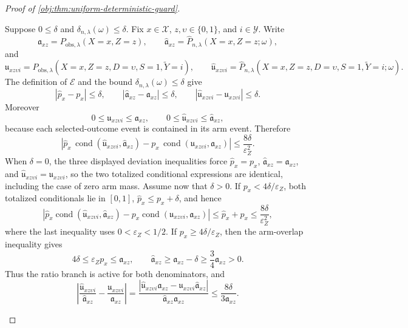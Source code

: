 \begin{proof}[Proof of \cref{obj:thm:uniform-deterministic-guard}]
\begin{enumerate}
Suppose \(0\le \delta\) and \(\delta_{n,\lambda}(\omega)\le\delta\).  Fix \(x\in\mathcal X\), \(z,\upsilon\in\{0,1\}\), and \(i\in\mathcal Y\).  Write
\[
\mathfrak a_{xz}=P_{\mathrm{obs},\lambda}(X=x,Z=z),
\qquad
\widehat{\mathfrak a}_{xz}
=
\widehat P_{n,\lambda}(X=x,Z=z;\omega),
\]
and
\[
\mathfrak u_{xz\upsilon i}=P_{\mathrm{obs},\lambda}(X=x,Z=z,D=\upsilon,S=1,\widetilde Y=i),
\qquad
\widehat{\mathfrak u}_{xz\upsilon i}
=
\widehat P_{n,\lambda}(X=x,Z=z,D=\upsilon,S=1,\widetilde Y=i;\omega).
\]
The definition of \(\mathcal E\) and the bound
\(\delta_{n,\lambda}(\omega)\le\delta\) give
\[
|\widehat p_x-p_x|\le\delta,
\qquad
|\widehat{\mathfrak a}_{xz}-\mathfrak a_{xz}|\le\delta,
\qquad
|\widehat{\mathfrak u}_{xz\upsilon i}-\mathfrak u_{xz\upsilon i}|\le\delta.
\]
Moreover
\[
0\le \mathfrak u_{xz\upsilon i}\le \mathfrak a_{xz},
\qquad
0\le \widehat{\mathfrak u}_{xz\upsilon i}\le \widehat{\mathfrak a}_{xz},
\]
because each selected-outcome event is contained in its arm event.  Therefore
\[
\left|
\widehat p_x\,
\operatorname{cond}(\widehat{\mathfrak u}_{xz\upsilon i},\widehat{\mathfrak a}_{xz})
-
p_x\,
\operatorname{cond}(\mathfrak u_{xz\upsilon i},\mathfrak a_{xz})
\right|
\le
\frac{8\delta}{\varepsilon_Z^2}.
\]
When \(\delta=0\), the three displayed deviation inequalities force
\(\widehat p_x=p_x\), \(\widehat{\mathfrak a}_{xz}=\mathfrak a_{xz}\), and
\(\widehat{\mathfrak u}_{xz\upsilon i}=\mathfrak u_{xz\upsilon i}\), so the two totalized
conditional expressions are identical, including the case of zero arm mass.
Assume now that \(\delta>0\).  If \(p_x<4\delta/\varepsilon_Z\), both totalized
conditionals lie in \([0,1]\), \(\widehat p_x\le p_x+\delta\), and hence
\[
\left|
\widehat p_x\operatorname{cond}(\widehat{\mathfrak u}_{xz\upsilon i},\widehat{\mathfrak a}_{xz})
-
p_x\operatorname{cond}(\mathfrak u_{xz\upsilon i},\mathfrak a_{xz})
\right|
\le
\widehat p_x+p_x
\le
\frac{8\delta}{\varepsilon_Z^2},
\]
where the last inequality uses \(0<\varepsilon_Z<1/2\).  If
\(p_x\ge4\delta/\varepsilon_Z\), then the arm-overlap inequality gives
\[
4\delta\le \varepsilon_Zp_x\le\mathfrak a_{xz},
\qquad
\widehat{\mathfrak a}_{xz}\ge \mathfrak a_{xz}-\delta\ge\frac34\mathfrak a_{xz}>0.
\]
Thus the ratio branch is active for both denominators, and
\[
\left|
\frac{\widehat{\mathfrak u}_{xz\upsilon i}}{\widehat{\mathfrak a}_{xz}}
-
\frac{\mathfrak u_{xz\upsilon i}}{\mathfrak a_{xz}}
\right|
=
\frac{|\widehat{\mathfrak u}_{xz\upsilon i}\mathfrak a_{xz}-\mathfrak u_{xz\upsilon i}\widehat{\mathfrak a}_{xz}|}
{\widehat{\mathfrak a}_{xz}\mathfrak a_{xz}}
\le
\frac{8\delta}{3\mathfrak a_{xz}}.
\]
\end{enumerate}
\end{proof}

